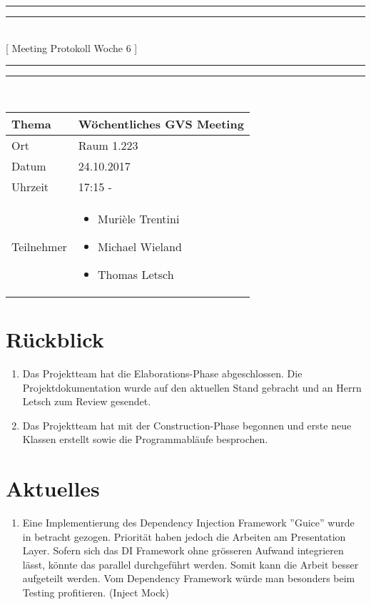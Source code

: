 \documentclass[11pt, a4paper,oneside]{scrartcl}
\begin{document}
\centering
\rule{\textwidth}{1.6pt}\vspace*{-\baselineskip}\vspace*{2pt} %
\rule{\textwidth}{0.4pt}\\[\baselineskip] %
{\LARGE [ Meeting Protokoll Woche 6 ]}\\[0.2\baselineskip] %
\rule{\textwidth}{0.4pt}\vspace*{-\baselineskip}\vspace{3.2pt} %
\rule{\textwidth}{1.6pt}\\[2\baselineskip] %

\begin{tabu} to \linewidth {l X }
	\toprule
	\textbf{Thema} & \textbf{Wöchentliches GVS Meeting} \\
	\midrule
	Ort & Raum 1.223 \\
	Datum & 24.10.2017  \\
	Uhrzeit &  17:15 -  \\
	Teilnehmer & 
	\begin{minipage}[t]{\textwidth}
	  	\begin{itemize}
			\item Murièle Trentini
			\item Michael Wieland
			\item Thomas Letsch
	  	\end{itemize}
	\end{minipage}
	\\
	\bottomrule
\end{tabu}


\section{Rückblick}
\begin{enumerate}
	\item Das Projektteam hat die Elaborations-Phase abgeschlossen. Die Projektdokumentation wurde auf den aktuellen Stand gebracht und an Herrn Letsch zum Review gesendet.
	\item Das Projektteam hat mit der Construction-Phase begonnen und erste neue Klassen erstellt sowie die Programmabläufe besprochen.
\end{enumerate}

\section{Aktuelles}
\begin{enumerate}
	\item Eine Implementierung des Dependency Injection Framework ''Guice'' wurde in betracht gezogen. Priorität haben jedoch die Arbeiten am Presentation Layer. Sofern sich das DI Framework ohne grösseren Aufwand integrieren lässt, könnte das parallel durchgeführt werden. Somit kann die Arbeit besser aufgeteilt werden. Vom Dependency Framework würde man besonders beim Testing profitieren. (Inject Mock)
\end{enumerate}
\end{document}
